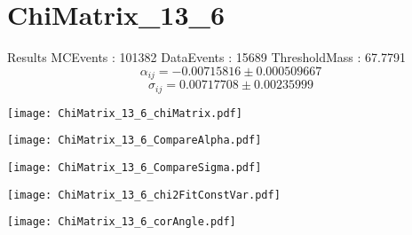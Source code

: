 \documentclass[a4paper,12pt]{article}
\begin{document}
\section{ChiMatrix\_13\_6}
\begin{minipage}{0.49\linewidth} Results \newline
MCEvents : 101382\newline
DataEvents : 15689 \newline
ThresholdMass : 67.7791\\
$$\alpha_{ij} = -0.00715816\pm 0.000509667$$
$$\sigma_{ij} = 0.00717708\pm 0.00235999$$
\end{minipage}\hfill
\begin{minipage}{0.49\linewidth} 
\texttt{[image: ChiMatrix\_13\_6\_chiMatrix.pdf]}\\
\end{minipage}
\hfill
\begin{minipage}{0.49\linewidth} 
\texttt{[image: ChiMatrix\_13\_6\_CompareAlpha.pdf]}\\
\end{minipage}
\hfill
\begin{minipage}{0.49\linewidth} 
\texttt{[image: ChiMatrix\_13\_6\_CompareSigma.pdf]}\\
\end{minipage}
\begin{minipage}{0.49\linewidth} 
\texttt{[image: ChiMatrix\_13\_6\_chi2FitConstVar.pdf]}\\
\end{minipage}
\hfill
\begin{minipage}{0.49\linewidth} 
\texttt{[image: ChiMatrix\_13\_6\_corAngle.pdf]}\\
\end{minipage}
\end{document}
